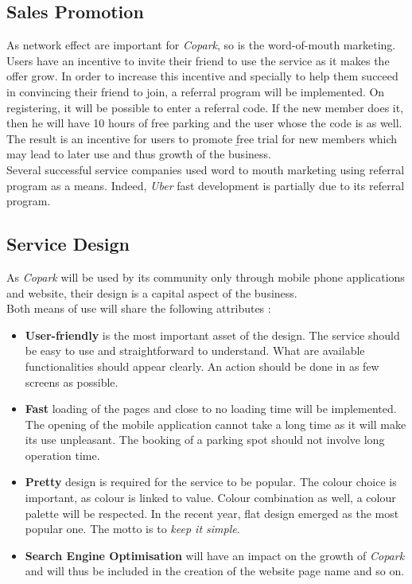 \documentclass[12pt,a4paper,oneside]{book}
\newcommand{\bp}{\textit{Copark}}
\begin{document}
\subsection{Sales Promotion}
As network effect are important for \bp{}, so is the word-of-mouth marketing.\\

Users have an incentive to invite their friend to use the service as it makes the offer grow. In order to increase this incentive and specially to help them succeed in convincing their friend to join, a referral program will be implemented. On registering, it will be possible to enter a referral code. If the new member does it, then he will have 10 hours of free parking and the user whose the code is as well.\\

The result is an incentive for users to promote \b free trial for new members which may lead to later use and thus growth of the business.\\

Several successful service companies used word to mouth marketing using referral program as a means. Indeed, \textit{Uber} fast development is partially due to its referral program.

\subsection{Service Design}
As \bp{} will be used by its community only through mobile phone applications and website, their design is a capital aspect of the business.\\

Both means of use will share the following attributes :
\begin{itemize}
\item \textbf{User-friendly} is the most important asset of the design. The service should be easy to use and straightforward to understand. What are available functionalities should appear clearly. An action should be done in as few screens as possible.
\item \textbf{Fast} loading of the pages and close to no loading time will be implemented. The opening of the mobile application cannot take a long time as it will make its use unpleasant. The booking of a parking spot should not involve long operation time.
\item \textbf{Pretty} design is required for the service to be popular. The colour choice is important, as colour is linked to value. Colour combination as well, a colour palette will be respected. In the recent year, flat design emerged as the most popular one. The motto is to \textit{keep it simple}.
\item \textbf{Search Engine Optimisation} will have an impact on the growth of \bp{} and will thus be included in the creation of the website page name and so on.
\end{itemize}
\end{document}
